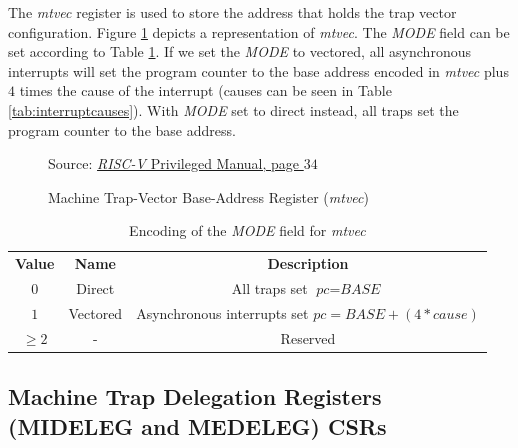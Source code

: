 The \textit{mtvec} register is used to store the address that holds the trap vector
configuration. Figure \ref{fig:mtvec} depicts a representation of \textit{mtvec}.
The \textit{MODE} field can be set according to Table \ref{tab:mode}. If we set
the \textit{MODE} to vectored, all asynchronous interrupts will set the program
counter to the base address encoded in \textit{mtvec} plus $4$ times the cause of
the interrupt (causes can be seen in Table \ref{tab:interruptcauses}). With
\textit{MODE} set to direct instead, all traps set the program counter to the
base address. \\
\begin{figure}[H]
  \centering
  \def\stackalignment{r} %
  {\scriptsize Source: \href{https://drive.google.com/file/d/17GeetSnT5wW3xNuAHI95-SI1gPGd5sJ_/view}{\textit{RISC-V} Privileged Manual, page $34$}}
  \caption{Machine Trap-Vector Base-Address Register (\textit{mtvec})}
  \label{fig:mtvec}
\end{figure}

\begin{table}
  \centering
  \begin{tabular}{|c|c|c|}
    \hline
    \textbf{Value}   & \textbf{Name} & \textbf{Description}                                                        \\
    \hhline{===} $0$ & Direct        & All traps set $\textit{pc}= \textit{BASE}$                                  \\
    \hline
    $1$              & Vectored      & Asynchronous interrupts set $\textit{pc}= \textit{BASE}+(4*\textit{cause})$ \\
    \hline
    $\geq 2$         & -             & Reserved                                                                    \\
    \hline
  \end{tabular}
  \caption{Encoding of the \textit{MODE} field for \textit{mtvec}}
  \label{tab:mode}
\end{table}

\subsection{Machine Trap Delegation Registers (MIDELEG and MEDELEG) CSRs}
\label{subsec:riscv_deleg}

